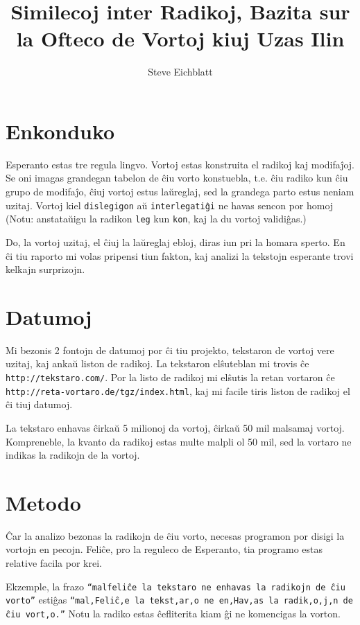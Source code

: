 \documentclass[12pt,twoside]{article}
\title{Similecoj inter Radikoj, Bazita sur la Ofteco de Vortoj kiuj Uzas Ilin}
\author{Steve Eichblatt}
\begin{document}
\maketitle

\thispagestyle{fancy}
\section{Enkonduko}

Esperanto estas tre regula lingvo. Vortoj estas konstruita el radikoj kaj modifaĵoj. Se oni imagas grandegan tabelon de ĉiu vorto konstuebla, 
t.e. ĉiu radiko kun ĉiu grupo de modifaĵo, ĉiuj vortoj estus laŭreglaj, sed la grandega parto estus neniam uzitaj. 
Vortoj kiel \texttt{dislegigon} aŭ \texttt{interlegatiĝi} ne havas sencon por homoj (Notu: anstataŭigu
la radikon \texttt{leg} kun \texttt{kon}, kaj la du vortoj validiĝas.)

Do, la vortoj uzitaj, el ĉiuj la laŭreglaj ebloj, diras iun pri la homara sperto.  
En ĉi tiu raporto mi volas pripensi tiun fakton, kaj analizi la tekstojn esperante trovi kelkajn surprizojn.

\section{Datumoj}

Mi bezonis 2 fontojn de datumoj por ĉi tiu projekto, tekstaron de vortoj vere uzitaj, kaj ankaŭ liston de radikoj. 
La tekstaron elŝuteblan mi trovis ĉe \texttt{http://tekstaro.com/}. Por la listo de radikoj mi elŝutis la retan vortaron ĉe
\texttt{http://reta-vortaro.de/tgz/index.html}, kaj mi facile tiris liston de radikoj el ĉi tiuj datumoj.

La tekstaro enhavas ĉirkaŭ 5 milionoj da vortoj, ĉirkaŭ 50 mil malsamaj vortoj. Kompreneble, la kvanto da radikoj estas
multe malpli ol 50 mil, sed la vortaro ne indikas la radikojn de la vortoj.

\section{Metodo}

Ĉar la analizo bezonas la radikojn de ĉiu vorto, necesas programon por disigi la vortojn en pecojn. Feliĉe, pro la reguleco
de Esperanto, tia programo estas relative facila por krei. 

Ekzemple, la frazo \texttt{``malfeliĉe la tekstaro ne enhavas la radikojn de ĉiu vorto''} estiĝas 
\texttt{``mal,Feliĉ,e la tekst,ar,o ne en,Hav,as la radik,o,j,n de ĉiu vort,o.''} Notu la radiko estas ĉefliterita
kiam ĝi ne komencigas la vorton. 
\end{document}
